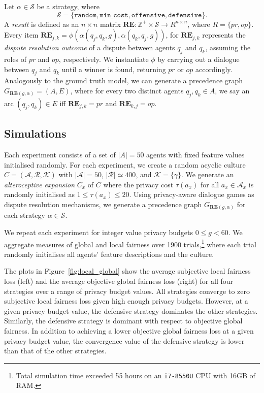 \documentclass[acmsmall]{custom-arxiv}  %
\begin{document}
Let $\alpha \in \mathcal{S}$ be a strategy, where $$\mathcal{S} = \{\texttt{random}, \texttt{min\_cost}, \texttt{offensive}, \texttt{defensive}\}.$$ A \textit{result} is defined as an $n\times n$ matrix $\mathbf{RE} : \mathbb{Z}^+ \times \mathcal{S} \rightarrow R^{n \times n}$, where $R = \{pr, op\}$. Every item $\mathbf{RE}_{j,k} = \phi(\alpha(q_j, q_k, g), \alpha(q_k, q_j, g))$, for $\mathbf{RE}_{j,k}$ represents the \textit{dispute resolution outcome} of a dispute between agents $q_j$ and $q_k$, assuming the roles of $pr$ and $op$, respectively.
We instantiate $\phi$ by carrying out a dialogue between $q_j$ and $q_k$ until a winner is found, returning $pr$ or $op$ accordingly.
Analogously to the ground truth model, we can generate a precedence graph $G_{\mathbf{RE}(g, \alpha)} = (A, E)$, where for every two distinct agents $q_j, q_k \in A$, we say an arc $(q_j, q_k) \in E$ iff $\mathbf{RE}_{j,k} = pr$ and $\mathbf{RE}_{k,j} = op$.

\subsection{Simulations}
\label{subsection:random-experiments}
Each experiment consists of a set of $|A| = 50$ agents with fixed feature values initialised randomly. For each experiment, we create a random acyclic culture $C = (\mathcal{A}, \mathcal{R}, \mathcal{K})$ with $|\mathcal{A}| = 50$, $|\mathcal{R}| \simeq 400$, and $\mathcal{K} = \{\gamma\}$. We generate an \textit{alteroceptive expansion} $C_x$ of $C$ where the privacy cost $\tau(a_x)$ for all $a_x \in \mathcal{A}_x$ is randomly initialised as $1 \leq \tau(a_x) \leq 20$. Using privacy-aware dialogue games as dispute resolution mechanisms, we generate a precedence graph $G_{\mathbf{RE}(g, \alpha)}$ for each strategy $\alpha \in \mathcal{S}$.

We repeat each experiment for integer value privacy budgets $0 \leq g < 60$. We aggregate measures of global and local fairness over 1900 trials,\footnote{Total simulation time exceeded 55 hours on an \texttt{i7-8550U} CPU with 16GB of RAM.} where each trial randomly initialises all agents' feature descriptions and the culture. 

The plots in Figure~\ref{fig:local_global} show the average subjective local fairness loss (left) and the average objective global fairness loss (right) for all four strategies over a range of privacy budget values. All strategies converge to zero subjective local fairness loss given high enough privacy budgets. However, at a given privacy budget value, the defensive strategy dominates the other strategies. Similarly, the defensive strategy is dominant with respect to objective global fairness. In addition to achieving a lower objective global fairness loss at a given privacy budget value, the convergence value of the defensive strategy is lower than that of the other strategies. 
\end{document}
